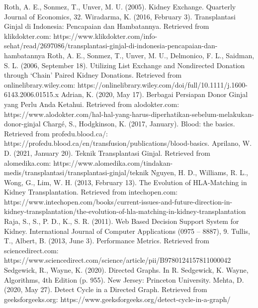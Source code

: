 \documentclass[conference]{IEEEtran}
\begin{document}
\begin{thebibliography}{00}
 Roth, A. E., Sonmez, T., Unver, M. U. (2005). Kidney Exchange. Quarterly Journal of Economics, 32.
 Wiradarma, K. (2016, February 3). Transplantasi Ginjal di Indonesia: Pencapaian dan Hambatannya. Retrieved from klikdokter.com: https://www.klikdokter.com/info-sehat/read/2697086/transplantasi-ginjal-di-indonesia-pencapaian-dan-hambatannya
 Roth, A. E., Sonmez, T., Unver, M. U., Delmonico, F. L., Saidman, S. L. (2006, September 18). Utilizing List Exchange and Nondirected Donation through ‘Chain’ Paired Kidney Donations. Retrieved from onlinelibrary.wiley.com: https://onlinelibrary.wiley.com/doi/full/10.1111/j.1600-6143.2006.01515.x
 Adrian, K. (2020, May 17). Berbagai Persiapan Donor Ginjal yang Perlu Anda Ketahui. Retrieved from alodokter.com: https://www.alodokter.com/hal-hal-yang-harus-diperhatikan-sebelum-melakukan-donor-ginjal
 Chargé, S., Hodgkinson, K. (2017, January). Blood: the basics. Retrieved from profedu.blood.ca/: https://profedu.blood.ca/en/transfusion/publications/blood-basics.
 Aprilano, W. D. (2021, January 20). Teknik Transplantasi Ginjal. Retrieved from alomedika.com: https://www.alomedika.com/tindakan-medis/transplantasi/transplantasi-ginjal/teknik
 Nguyen, H. D., Williams, R. L., Wong, G., Lim, W. H. (2013, February 13). The Evolution of HLA-Matching in Kidney Transplantation. Retrieved from intechopen.com: https://www.intechopen.com/books/current-issues-and-future-direction-in-kidney-transplantation/the-evolution-of-hla-matching-in-kidney-transplantation
 Raja, S., S., P. D., K., S. R. (2011). Web Based Decision Support System for Kidney. International Journal of Computer Applications (0975 – 8887), 9.
 Tullis, T., Albert, B. (2013, June 3). Performance Metrics. Retrieved from sciencedirect.com: https://www.sciencedirect.com/science/article/pii/B9780124157811000042
 Sedgewick, R., Wayne, K. (2020). Directed Graphs. In R. Sedgewick, K. Wayne, Algorithms, 4th Edition (p. 955). New Jersey: Princeton University.
 Mehta, D. (2020, May 27). Detect Cycle in a Directed Graph. Retrieved from geeksforgeeks.org: https://www.geeksforgeeks.org/detect-cycle-in-a-graph/
\end{thebibliography}
\end{document}
